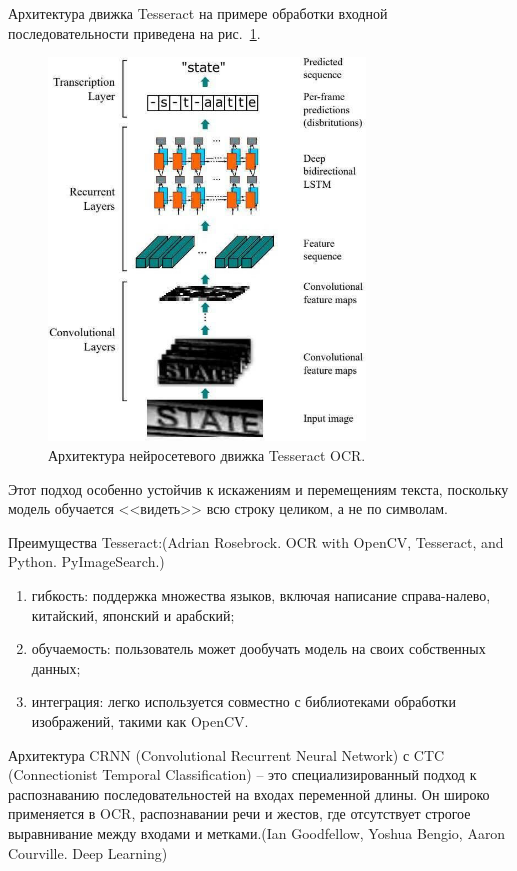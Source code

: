 Архитектура движка Tesseract на примере обработки входной последовательности 
приведена на рис.~\ref{fig:tesseract}.

\begin{figure}[H]
    \centering
    \includegraphics[width=0.75\textwidth]{
        imgs/theory/TesseractOCR.png
    }
    \caption{Архитектура нейросетевого движка Tesseract OCR.}
    \label{fig:tesseract}
\end{figure}
\vspace{-0.85cm}

Этот подход особенно устойчив к искажениям и перемещениям текста, поскольку 
модель обучается <<видеть>> всю строку целиком, а не по символам.

Преимущества Tesseract:(Adrian Rosebrock. OCR with OpenCV, Tesseract, and Python. PyImageSearch.)

\begin{enumerate}
    \item гибкость: поддержка множества языков, включая написание справа-налево, 
    китайский, японский и арабский;
    \item обучаемость: пользователь может дообучать модель на своих собственных 
    данных;
    \item интеграция: легко используется совместно с библиотеками обработки 
    изображений, такими как OpenCV.
\end{enumerate}

Архитектура CRNN (Convolutional Recurrent Neural Network) с CTC (Connectionist 
Temporal Classification) -- это специализированный подход к распознаванию 
последовательностей на входах переменной длины. Он широко применяется в OCR, 
распознавании речи и жестов, где отсутствует строгое выравнивание между входами 
и метками.(Ian Goodfellow, Yoshua Bengio, Aaron Courville. Deep Learning)

